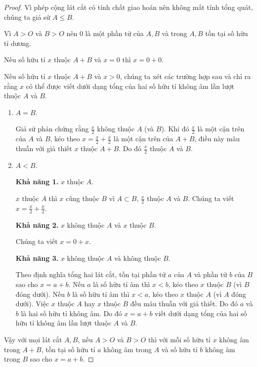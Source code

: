 \begin{proof}
    Vì phép cộng lát cắt có tính chất giao hoán nên không mất tính tổng quát, chúng ta giả sử $A\leq B$.

    Vì $A > O$ và $B > O$ nên $0$ là một phần tử của $A, B$ và trong $A, B$ tồn tại số hữu tỉ dương.

    Nếu số hữu tỉ $x$ thuộc $A + B$ và $x = 0$ thì $x = 0 + 0$.

    Nếu số hữu tỉ $x$ thuộc $A + B$ và $x > 0$, chúng ta xét các trường hợp sau và chỉ ra rằng $x$ có thể được viết dưới dạng tổng của hai số hữu tỉ không âm lần lượt thuộc $A$ và $B$.
    \begin{enumerate}[label={\textbf{Trường hợp \arabic*.}},itemindent=1.5cm]
        \item $A = B$.

              Giả sử phản chứng rằng $\frac{x}{2}$ không thuộc $A$ (và $B$). Khi đó $\frac{x}{2}$ là một cận trên của $A$ và $B$, kéo theo $x = \frac{x}{2} + \frac{x}{2}$ là một cận trên của $A + B$, điều này mâu thuẫn với giả thiết $x$ thuộc $A + B$. Do đó $\frac{x}{2}$ thuộc $A$ và $B$.
        \item $A < B$.

              \textbf{Khả năng 1.} $x$ thuộc $A$.

              $x$ thuộc $A$ thì $x$ cũng thuộc $B$ vì $A\subset B$, $\frac{x}{2}$ thuộc $A$ và $B$. Chúng ta viết $x = \frac{x}{2} + \frac{x}{2}$.

              \textbf{Khả năng 2.} $x$ không thuộc $A$ và $x$ thuộc $B$.

              Chúng ta viết $x = 0 + x$.

              \textbf{Khả năng 3.} $x$ không thuộc $A$ và không thuộc $B$.

              Theo định nghĩa tổng hai lát cắt, tồn tại phần tử $a$ của $A$ và phần tử $b$ của $B$ sao cho $x = a + b$. Nếu $a$ là số hữu tỉ âm thì $x < b$, kéo theo $x$ thuộc $B$ (vì $B$ đóng dưới). Nếu $b$ là số hữu tỉ âm thì $x < a$, kéo theo $x$ thuộc $A$ (vì $A$ đóng dưới). Việc $x$ thuộc $A$ hay $x$ thuộc $B$ đều mâu thuẫn với giả thiết. Do đó $a$ và $b$ là hai số hữu tỉ không âm. Do đó $x = a + b$ viết dưới dạng tổng của hai số hữu tỉ không âm lần lượt thuộc $A$ và $B$.
    \end{enumerate}

    Vậy với mọi lát cắt $A, B$, nếu $A > O$ và $B > O$ thì với mỗi số hữu tỉ $x$ không âm trong $A + B$, tồn tại số hữu tỉ $a$ không âm trong $A$ và số hữu tỉ $b$ không âm trong $B$ sao cho $x = a + b$.
\end{proof}

